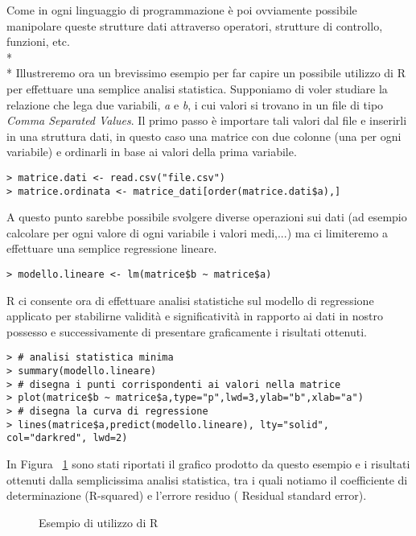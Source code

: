 \documentclass[12pt,a4paper,openright,twoside]{report}
\begin{document}
Come in ogni linguaggio di programmazione è poi ovviamente possibile manipolare queste strutture dati attraverso operatori, strutture di controllo, funzioni, etc.\\* \\*
Illustreremo ora un brevissimo esempio per far capire un possibile utilizzo di R per effettuare una semplice analisi statistica. Supponiamo di voler studiare la relazione che lega due variabili, \emph{a} e \emph{b}, i cui valori si trovano in un file di tipo \emph{Comma Separated Values}. Il primo passo è importare tali valori dal file e inserirli in una struttura dati, in questo caso una matrice con due colonne (una per ogni variabile) e ordinarli in base ai valori della prima variabile.

\lstset{language=R}
\begin{lstlisting}
> matrice.dati <- read.csv("file.csv")
> matrice.ordinata <- matrice_dati[order(matrice.dati$a),]
\end{lstlisting}

A questo punto sarebbe possibile svolgere diverse operazioni sui dati (ad esempio calcolare per ogni valore di ogni variabile i valori medi,...) ma ci limiteremo a effettuare una semplice regressione lineare.
\begin{lstlisting}
> modello.lineare <- lm(matrice$b ~ matrice$a)
\end{lstlisting}

R ci consente ora di effettuare analisi statistiche sul modello di regressione applicato per stabilirne validità e significatività in rapporto ai dati in nostro possesso e successivamente di presentare graficamente i risultati ottenuti.
\begin{lstlisting}
> # analisi statistica minima
> summary(modello.lineare)       
> # disegna i punti corrispondenti ai valori nella matrice
> plot(matrice$b ~ matrice$a,type="p",lwd=3,ylab="b",xlab="a")    
> # disegna la curva di regressione
> lines(matrice$a,predict(modello.lineare), lty="solid", col="darkred", lwd=2)    
\end{lstlisting}


In Figura ~\ref{example_r} sono stati riportati il grafico prodotto da questo esempio e i risultati ottenuti dalla semplicissima analisi statistica, tra i quali notiamo il coefficiente di determinazione (R-squared) e l'errore residuo (
Residual standard error).

\begin{figure}[H]
	\centering
	\quad
	\caption{Esempio di utilizzo di R}
	\label{example_r}
\end{figure}
\end{document}
